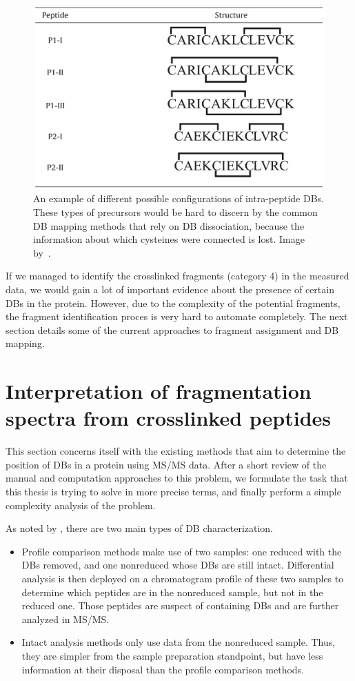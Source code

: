 \begin{figure}
  \centering
  \includegraphics[width=.5\linewidth]{img/intrapeptide-bond.jpeg}
  \caption{An example of different possible configurations of intra-peptide DBs. These types of precursors would be hard to discern by the common DB mapping methods that rely on DB dissociation, because the information about which cysteines were connected is lost. Image by~\citet{durand2013tandem}.}\label{fig:intrapeptide-bonds}
\end{figure}

If we managed to identify the crosslinked fragments (category 4) in the measured data, we would gain a lot of important evidence about the presence of certain DBs in the protein. However, due to the complexity of the potential fragments, the fragment identification proces is very hard to automate completely. The next section details some of the current approaches to fragment assignment and DB mapping.

\section{Interpretation of fragmentation spectra from crosslinked peptides}\label{sec:analysis}

This section concerns itself with the existing methods that aim to determine the position of DBs in a protein using MS/MS data. After a short review of the manual and computation approaches to this problem, we formulate the task that this thesis is trying to solve in more precise terms, and finally perform a simple complexity analysis of the problem.

As noted by \citet{lakbub2018recent}, there are two main types of DB characterization.

\begin{itemize}
  \item Profile comparison methods make use of two samples: one reduced with the DBs removed, and one nonreduced whose DBs are still intact. Differential analysis is then deployed on a chromatogram profile of these two samples to determine which peptides are in the nonreduced sample, but not in the reduced one. Those peptides are suspect of containing DBs and are further analyzed in MS/MS\@.
  \item Intact analysis methods only use data from the nonreduced sample. Thus, they are simpler from the sample preparation standpoint, but have less information at their disposal than the profile comparison methods.
\end{itemize}

